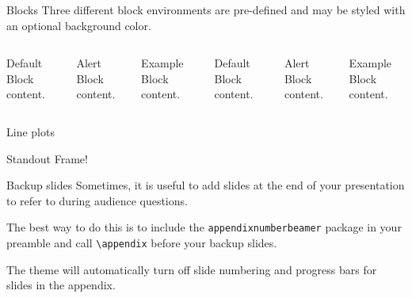 \begin{frame}{Blocks}
	Three different block environments are pre-defined and may be styled with an
	optional background color.
	
	\begin{columns}[T,onlytextwidth]
		\begin{block}{Default}
			Block content.
		\end{block}
		
		\begin{alertblock}{Alert}
			Block content.
		\end{alertblock}
		
		\begin{exampleblock}{Example}
			Block content.
		\end{exampleblock}
		
		
		
		\begin{block}{Default}
			Block content.
		\end{block}
		
		\begin{alertblock}{Alert}
			Block content.
		\end{alertblock}
		
		\begin{exampleblock}{Example}
			Block content.
		\end{exampleblock}
		
	\end{columns}
\end{frame}
\begin{frame}{Line plots}
	\begin{figure}
	\end{figure}
\end{frame}

\begin{frame}[standout]
	Standout Frame!
\end{frame}


\appendix
\begin{frame}[fragile]{Backup slides}
	Sometimes, it is useful to add slides at the end of your presentation to
	refer to during audience questions.
	
	The best way to do this is to include the \verb|appendixnumberbeamer|
	package in your preamble and call \verb|\appendix| before your backup slides.
	
	The theme will automatically turn off slide numbering and progress bars for
	slides in the appendix.
\end{frame}

